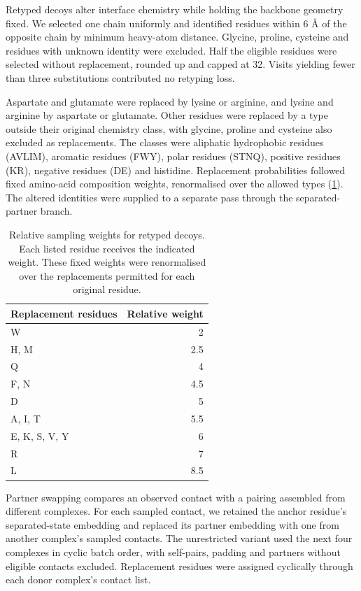 Retyped decoys alter interface chemistry while holding the backbone geometry fixed. We selected one chain uniformly and identified residues within 6 \AA{} of the opposite chain by minimum heavy-atom distance. Glycine, proline, cysteine and residues with unknown identity were excluded. Half the eligible residues were selected without replacement, rounded up and capped at 32. Visits yielding fewer than three substitutions contributed no retyping loss.

Aspartate and glutamate were replaced by lysine or arginine, and lysine and arginine by aspartate or glutamate. Other residues were replaced by a type outside their original chemistry class, with glycine, proline and cysteine also excluded as replacements. The classes were aliphatic hydrophobic residues (AVLIM), aromatic residues (FWY), polar residues (STNQ), positive residues (KR), negative residues (DE) and histidine. Replacement probabilities followed fixed amino-acid composition weights, renormalised over the allowed types (\cref{tab:jaxka-retyping-weights}). The altered identities were supplied to a separate pass through the separated-partner branch.

\begin{table}[htbp]
    \centering
    \small
    \begin{tabular}{lr}
        \toprule
        Replacement residues & Relative weight \\
        \midrule
        W & 2 \\
        H, M & 2.5 \\
        Q & 4 \\
        F, N & 4.5 \\
        D & 5 \\
        A, I, T & 5.5 \\
        E, K, S, V, Y & 6 \\
        R & 7 \\
        L & 8.5 \\
        \bottomrule
    \end{tabular}
    \caption{Relative sampling weights for retyped decoys. Each listed residue receives the indicated weight. These fixed weights were renormalised over the replacements permitted for each original residue.}
    \label{tab:jaxka-retyping-weights}
\end{table}

Partner swapping compares an observed contact with a pairing assembled from different complexes. For each sampled contact, we retained the anchor residue's separated-state embedding and replaced its partner embedding with one from another complex's sampled contacts. The unrestricted variant used the next four complexes in cyclic batch order, with self-pairs, padding and partners without eligible contacts excluded. Replacement residues were assigned cyclically through each donor complex's contact list.

